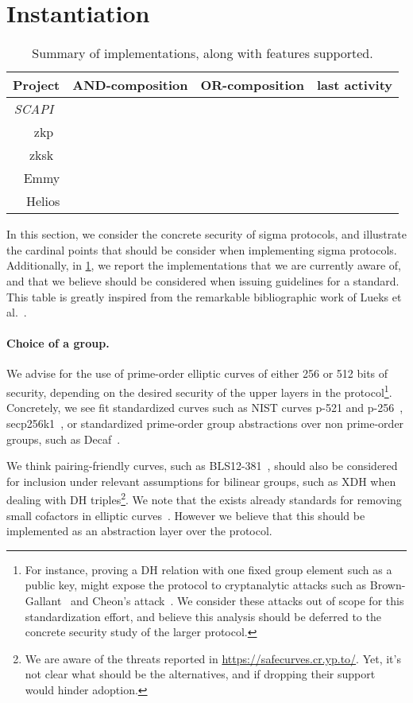 \documentclass[runningheads]{llncs}
\begin{document}
\section{Instantiation }

\begin{table}[t]
  \caption{Summary of implementations, along with features supported.
  \label{table:implementations}}
  \centering
\begin{tabular}{r|ccc}
  Project & AND-composition & OR-composition & last activity \\
  \hline
  \emph{SCAPI}~\cite{scapi}\\
  zkp~\cite{zkp}\\
  zksk~\cite{zksk}\\
  Emmy\\
  Helios \\
\end{tabular}
\end{table}

In this section, we consider the concrete security of sigma protocols, and illustrate the cardinal points that should be consider when implementing sigma protocols.
Additionally, in \cref{table:implementations}, we report the implementations that we are currently aware of, and that we believe should be considered when issuing guidelines for a standard.
This table is greatly inspired from the remarkable bibliographic work of Lueks et al.~\cite{zksk}.
\paragraph{Choice of a group.} We advise for the use of prime-order elliptic curves of either 256 or 512 bits of security, depending on the desired security of the upper layers in the protocol\footnote{For instance, proving a DH relation with one fixed group element such as a public key, might expose the protocol to cryptanalytic attacks such as Brown-Gallant~\cite{EPRINT:BroGal04} and Cheon’s attack~\cite{EC:Cheon06}. We consider these attacks out of scope for this standardization effort, and believe this analysis should be deferred to the concrete security study of the larger protocol.}.
Concretely, we see fit standardized curves such as NIST curves p-521 and p-256~\cite{fips2}, secp256k1~\cite{SECG}, or standardized prime-order group abstractions over non prime-order groups, such as Decaf~\cite{cfrg-ristretto-decaf}.

We think pairing-friendly curves, such as BLS12-381~\cite{XX}, should also be considered for inclusion under relevant assumptions for bilinear groups, such as XDH when dealing with DH triples\footnote{We are aware of the threats reported in
\url{https://safecurves.cr.yp.to/}.
Yet, it's not clear what should be the alternatives, and if dropping their support would hinder adoption.
}.
We note that the exists already standards for removing small cofactors in elliptic curves~\cite{rfc2785}.
 However we believe that this should be implemented as an abstraction layer over the protocol.
\end{document}
